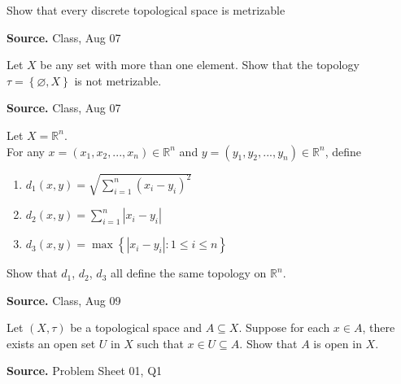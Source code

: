 \documentclass[12pt,twoside]{report}
\newenvironment*{source}{\hfill\scriptsize\textbf{Source.}\space}{\par}
\begin{document}
\begin{samepage}
\begin{ex}
Show that every discrete topological space is metrizable
\end{ex}
\begin{source}
Class, Aug 07
\end{source}
\end{samepage}

\begin{samepage}
\begin{ex}
Let $X$ be any set with more than one element. 
Show that the topology $\tau = \left\{ \varnothing, X \right\}$ is not metrizable.
\end{ex}
\begin{source}
Class, Aug 07
\end{source}
\end{samepage}

\begin{samepage}
\begin{ex}
Let $X = \mathbb{R} ^n$. \\
For any $x = \left (x_1, x_2, ..., x_n\right ) \in \mathbb{R} ^n$ and 
$y = \left (y_1, y_2, ..., y_n\right ) \in \mathbb{R} ^n$, define 
\begin{enumerate}
    \item $ d_1 \left (x,y\right ) = \sqrt { \sum_{i = 1}^n \left (x_i - y_i\right ) ^2 } $
    \item $ d_2 \left (x,y\right ) = \sum_{i = 1}^n |x_i - y_i| $
    \item $ d_3 \left (x,y\right ) = \displaystyle\max \left\{ | x_i - y_i |  :  1 \leq i \leq n \right\} $
\end{enumerate}
Show that $d_1$, $d_2$, $d_3$ all define the same topology on $\mathbb{R} ^n$.
\end{ex}
\begin{source}
Class, Aug 09
\end{source}
\end{samepage}

\begin{samepage}
\begin{ex}
Let $\left (X, \tau\right )$ be a topological space and $A \subseteq X$.
Suppose for each $x \in A$, there exists an open set $U$ in $X$ such that $x \in U \subseteq A$. Show that $A$ is open in $X$.
\end{ex}
\begin{source}
Problem Sheet 01, Q1
\end{source}
\end{samepage}
\end{document}
